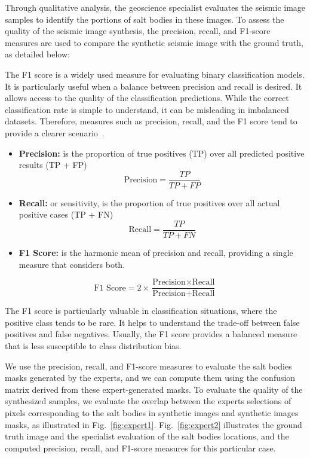 \documentclass{ieeeaccess}
\begin{document}
Through qualitative analysis, the geoscience specialist evaluates the seismic image samples to identify the portions of salt bodies in these images. To assess the quality of the seismic image synthesis, the precision, recall, and F1-score measures are used to compare the synthetic seismic image with the ground truth, as detailed below:

The F1 score is a widely used measure for evaluating binary classification models. It is particularly useful when a balance between precision and recall is desired. It allows access to the quality of the classification predictions. While the correct classification rate is simple to understand, it can be misleading in imbalanced datasets. Therefore, measures such as precision, recall, and the F1 score tend to provide a clearer scenario~\cite{Powers2011}.

\begin{itemize}
    \item \textbf{Precision:} is the proportion of true positives (TP) over all predicted positive results (TP + FP)
    \begin{equation}
    \text{Precision} = \frac{TP}{TP + FP}
    \end{equation}

    \item \textbf{Recall:} or sensitivity, is the proportion of true positives over all actual positive cases (TP + FN)
    \begin{equation}
    \text{Recall} = \frac{TP}{TP + FN}
    \end{equation}

    \item \textbf{F1 Score:} is the harmonic mean of precision and recall, providing a single measure that considers both. 

\end{itemize}
    \begin{equation}
    \text{F1 Score} = 2 \times \frac{\text{Precision} \times \text{Recall}}{\text{Precision} + \text{Recall}}
    \end{equation}
    
The F1 score is particularly valuable in classification situations, where the positive class tends to be rare. It helps to understand the trade-off between false positives and false negatives. Usually, the F1 score provides a balanced measure that is less susceptible to class distribution bias.

We use the precision, recall, and F1-score measures to evaluate the salt bodies masks generated by the experts, and we can compute them using the confusion matrix derived from these expert-generated masks. To evaluate the quality of the synthesized samples, we evaluate the overlap between the experts selections of pixels corresponding to the salt bodies in synthetic images and synthetic images masks, as illustrated in Fig.~\ref{fig:expert1}. Fig.~\ref{fig:expert2} illustrates the ground truth image and the specialist evaluation of the salt bodies locations, and the computed precision, recall, and F1-score measures for this particular case.
\end{document}
